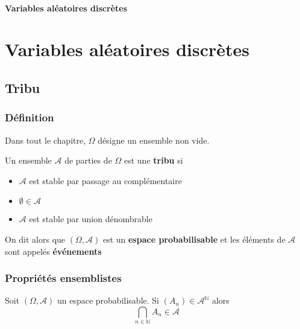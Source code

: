 \ifsolo
    ~

    \vspace{1cm}

    \begin{center}
        \textbf{\LARGE Variables aléatoires discrètes} \\[1em]
    \end{center}
    \tableofcontents
\else
    \chapter{Variables aléatoires discrètes}

    \minitoc
\fi
\thispagestyle{empty}

\section{Tribu}
\subsection{Définition}

Dans tout le chapitre, $\Omega$ désigne un ensemble non vide.

\begin{dfn}
    Un ensemble $\mathcal A$ de parties de $\Omega$ est une \textbf{tribu} si \begin{itemize}
        \item $ \mathcal A$ est stable par passage au complémentaire
        \item $\emptyset \in \mathcal A$
        \item $ \mathcal A$ est stable par union dénombrable
    \end{itemize}
    On dit alors que $(\Omega, \mathcal A)$ est un \textbf{espace probabilisable}  et les éléments de $\mathcal A$ sont appelés  \textbf{événements} 
\end{dfn}


\subsection{Propriétés ensemblistes}

\begin{prop}
    Soit $(\Omega, \mathcal A)$ un espace probabilisable. Si $(A_n)\in \mathcal A^{\mathbb N}$ alors \[
        \bigcap_{n\in\mathbb N}A_n \in \mathcal A
    \]
\end{prop}

